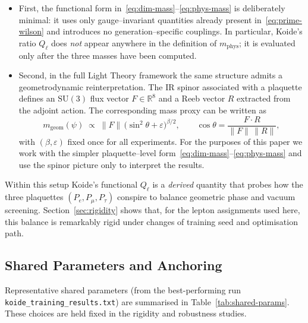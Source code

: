 \documentclass[12pt]{article}
\begin{document}
\begin{itemize}
  \item First, the functional form
        in~\eqref{eq:dim-mass}--\eqref{eq:phys-mass} is deliberately
        minimal: it uses only gauge--invariant quantities already
        present in~\eqref{eq:prime-wilson} and introduces no
        generation--specific couplings.  In particular, Koide's ratio
        $Q_\ell$ does \emph{not} appear anywhere in the definition of
        $m_{\mathrm{phys}}$; it is evaluated only after the three
        masses have been computed.

  \item Second, in the full Light Theory framework the same structure
        admits a geometrodynamic reinterpretation.  The IR spinor
        associated with a plaquette defines an $\mathrm{SU}(3)$ flux
        vector $F\in\mathbb{R}^8$ and a Reeb vector $R$ extracted from
        the adjoint action.  The corresponding mass proxy can be
        written as
        \begin{equation}
          m_{\mathrm{geom}}(\psi)
            \;\propto\; \|F\|\,
              \bigl(\sin^2\theta + \varepsilon\bigr)^{\beta/2},
          \qquad
          \cos\theta = \frac{F\cdot R}{\|F\|\,\|R\|},
        \end{equation}
        with $(\beta,\varepsilon)$ fixed once for all experiments.
        For the purposes of this paper we work with the simpler
        plaquette--level form~\eqref{eq:dim-mass}--\eqref{eq:phys-mass}
        and use the spinor picture only to interpret the results.
\end{itemize}

Within this setup Koide's functional $Q_\ell$ is a \emph{derived}
quantity that probes how the three plaquettes
$(P_e,P_\mu,P_\tau)$ conspire to balance geometric phase and vacuum
screening.  Section~\ref{sec:rigidity} shows that, for the lepton
assignments used here, this balance is remarkably rigid under changes
of training seed and optimisation path.

\subsection{Shared Parameters and Anchoring}
Representative shared parameters (from the best-performing run
\texttt{koide\_training\_results.txt}) are summarised in Table~\ref{tab:shared-params}.
These choices are held fixed in the rigidity and robustness studies.
\end{document}
